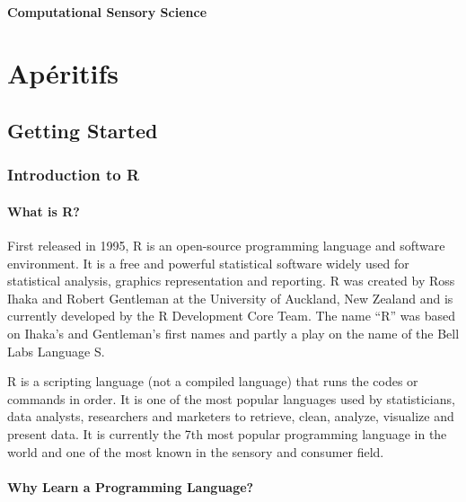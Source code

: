 \documentclass[
]{book}
\begin{document}
\hypertarget{computational-sensory-science}{%
\subsection*{Computational Sensory Science}\label{computational-sensory-science}}

\hypertarget{part-apuxe9ritifs}{%
\part*{Apéritifs}\label{part-apuxe9ritifs}}

\hypertarget{start-R}{%
\chapter{Getting Started}\label{start-R}}

\hypertarget{introduction-to-r}{%
\section{Introduction to R}\label{introduction-to-r}}

\hypertarget{what-is-r}{%
\subsection{What is R?}\label{what-is-r}}

First released in 1995, R is an open-source programming language and software environment. It is a free and powerful statistical software widely used for statistical analysis, graphics representation and reporting. R was created by Ross Ihaka and Robert Gentleman at the University of Auckland, New Zealand and is currently developed by the R Development Core Team. The name ``R'' was based on Ihaka's and Gentleman's first names and partly a play on the name of the Bell Labs Language S.

R is a scripting language (not a compiled language) that runs the codes or commands in order.
It is one of the most popular languages used by statisticians, data analysts, researchers and marketers to retrieve, clean, analyze, visualize and present data. It is currently the 7th most popular programming language in the world and one of the most known in the sensory and consumer field.

\hypertarget{why-learn-a-programming-language}{%
\subsection{Why Learn a Programming Language?}\label{why-learn-a-programming-language}}
\end{document}
